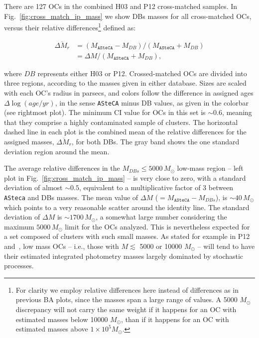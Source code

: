 \documentclass{aa}
\begin{document}
There are 127 OCs in the combined H03 and P12 cross-matched samples.
In Fig.~\ref{fig:cross_match_ip_mass} we show DBs masses for all cross-matched
OCs, versus their relative differences\footnote{For clarity we employ relative
differences here instead of differences as in previous BA plots, since the
masses span a large range of values. A 5000 $M_{\odot}$ discrepancy will not
carry the same weight if it happens for an OC with estimated masses below 10000
$M_{\odot}$, than if it happens for an OC with estimated masses above
$1{\times}10^5M_{\odot}$.} defined as:

\begin{equation}
\begin{split}
\overline{\Delta M_r} & = (M_{\mathtt{ASteCA}}-M_{DB})/(M_{\mathtt{ASteCA}}
+M_{DB}) \\
& = \Delta M/(M_{\mathtt{ASteCA}}+M_{DB}),
\end{split}
\label{eq:rel_diffs}
\end{equation}

\noindent where $DB$ represents either H03 or P12. Crossed-matched OCs are
divided into three regions, according to the masses given in either database.
%
Sizes are scaled with each OC's radius in parsecs, and colors follow the
difference in assigned ages $\Delta \log(age/yr)$, in the sense \texttt{ASteCA}
minus DB values, as given in the colorbar (see rightmost plot).
The minimum CI value for OCs in this set is ${\sim}0.6$, meaning that they
comprise a highly contaminated sample of clusters.
The horizontal dashed line in each plot is the combined mean of the relative
differences for the assigned masses, $\overline{\Delta M_r}$, for both DBs.
The gray band shows the one standard deviation region around the mean.

The average relative differences in the $M_{DBs}{\le}5000\,M_{\odot}$
low-mass region -- left plot in Fig.~\ref{fig:cross_match_ip_mass} -- is very
close to zero, with a standard deviation of almost ${\sim}0.5$, equivalent to a
multiplicative factor of 3 between \texttt{ASteca} and DBs masses.
%
The mean value of $\Delta M$ (${=}M_{\mathtt{ASteCA}}-M_{DBs}$), is
${\sim}40\,M_{\odot}$ which points to a very reasonable scatter around the
identity line. The standard deviation of $\Delta M$ is ${\sim}1700\,M_{\odot}$,
a somewhat large number considering the maximum $5000\,M_{\odot}$ limit for the
OCs analyzed. This is nevertheless expected for a set composed of clusters with
such small masses.
As stated for example in P12 and~\cite{Baumgardt_2013}, low mass OCs -- i.e.,
those with $M{\lesssim}$ 5000 or 10000 $M_{\odot}$ -- will tend to have their
estimated integrated photometry masses largely dominated by stochastic
processes.
\end{document}
